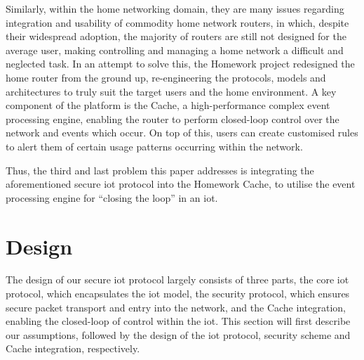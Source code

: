 \documentclass{mpaper}
\begin{document}
Similarly, within the home networking domain, they are many issues regarding integration and usability of commodity home network routers, in which, despite their widespread adoption, the majority of routers are still not designed for the average user, making controlling and managing a home network a difficult and neglected task. In an attempt to solve this, the Homework project redesigned the home router from the ground up, re-engineering the protocols, models and architectures to truly suit the target users and the home environment\cite{HomeworkProject,Homework}. A key component of the platform is the Cache\cite{Cache}, a high-performance complex event processing engine, enabling the router to perform closed-loop control over the network and events which occur. On top of this, users can create customised rules to alert them of certain usage patterns occurring within the network.

Thus, the third and last problem this paper addresses is integrating the aforementioned secure iot protocol into the Homework Cache, to utilise the event processing engine for ``closing the loop'' in an iot.

\section{Design} %
\label{sec:design}
The design of our secure iot protocol largely consists of three parts, the core iot protocol, which encapsulates the iot model, the security protocol, which ensures secure packet transport and entry into the network, and the Cache integration, enabling the closed-loop of control within the iot. This section will first describe our assumptions, followed by the design of the iot protocol, security scheme and Cache integration, respectively.
\end{document}
